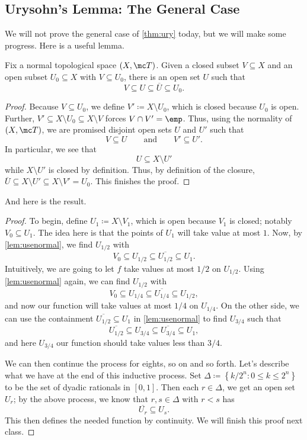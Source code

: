 \documentclass[../notes.tex]{subfiles}
\begin{document}
\subsection{Urysohn's Lemma: The General Case}
We will not prove the general case of \autoref{thm:ury} today, but we will make some progress. Here is a useful lemma.
\begin{lemma} \label{lem:usenormal}
	Fix a normal topological space $(X,\mc T)$. Given a closed subset $V\subseteq X$ and an open subset $U_0\subseteq X$ with $V\subseteq U_0$, there is an open set $U$ such that
	\[V\subseteq U\subseteq\overline U\subseteq U_0.\]
\end{lemma}
\begin{proof}
	Because $V\subseteq U_0$, we define $V'\coloneqq X\setminus U_0$, which is closed because $U_0$ is open. Further, $V'\subseteq X\setminus U_0\subseteq X\setminus V$ forces $V\cap V'=\emp$. Thus, using the normality of $(X,\mc T)$, we are promised disjoint open sets $U$ and $U'$ such that
	\[V\subseteq U\qquad\text{and}\qquad V'\subseteq U'.\]
	In particular, we see that
	\[U\subseteq X\setminus U'\]
	while $X\setminus U'$ is closed by definition. Thus, by definition of the closure, $\overline U\subseteq X\setminus U'\subseteq X\setminus V'=U_0$. This finishes the proof.
\end{proof}
And here is the result.
\urythm*
\begin{proof}
	To begin, define $U_1\coloneqq X\setminus V_1$, which is open because $V_1$ is closed; notably $V_0\subseteq U_1$. The idea here is that the points of $U_1$ will take value at most $1$. Now, by \autoref{lem:usenormal}, we find $U_{1/2}$ with
	\[V_0\subseteq U_{1/2}\subseteq\overline{U_{1/2}}\subseteq U_1.\]
	Intuitively, we are going to let $f$ take values at most $1/2$ on $U_{1/2}$. Using \autoref{lem:usenormal} again, we can find $U_{1/2}$ with
	\[V_0\subseteq U_{1/4}\subseteq\overline{U_{1/4}}\subseteq U_{1/2},\]
	and now our function will take values at most $1/4$ on $U_{1/4}$. On the other side, we can use the containment $\overline{U_{1/2}}\subseteq U_1$ in \autoref{lem:usenormal} to find $U_{3/4}$ such that
	\[\overline{U_{1/2}}\subseteq U_{3/4}\subseteq\overline{U_{3/4}}\subseteq U_1,\]
	and here $U_{3/4}$ our function should take values less than $3/4.$

	We can then continue the process for eights, so on and so forth. Let's describe what we have at the end of this inductive process. Set $\Delta\coloneqq\left\{k/2^n:0\le k\le 2^n\right\}$ to be the set of dyadic rationals in $[0,1]$. Then each $r\in\Delta$, we get an open set $U_r$; by the above process, we know that $r,s\in\Delta$ with $r<s$ has
	\[\overline{U_r}\subseteq U_s.\]
	This then defines the needed function by continuity. We will finish this proof next class.
\end{proof}
\end{document}
